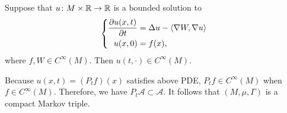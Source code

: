 \begin{thm}
    Suppose that $u \colon M \times \mathbb{R} \rightarrow \mathbb{R}$ is a bounded solution to
    \begin{equation*}
        \left\{
            \begin{aligned}
                \frac{\partial u(x,t)}{\partial t} &= \Delta u - \left\langle \nabla W,\nabla u \right\rangle \\
                u(x,0) &= f(x),
            \end{aligned}
        \right.
    \end{equation*}
    where $f,W \in C^\infty(M)$. Then $u(t,\cdot) \in C^\infty(M)$.
\end{thm}
Because $u(x,t) = (P_tf)(x)$ satisfies above PDE, $P_tf \in C^\infty(M)$ when $f \in C^\infty(M)$. Therefore, we have $P_t\mathcal{A} \subset \mathcal{A}$. It follows that $(M,\mu,\Gamma)$ is a compact Markov triple.

